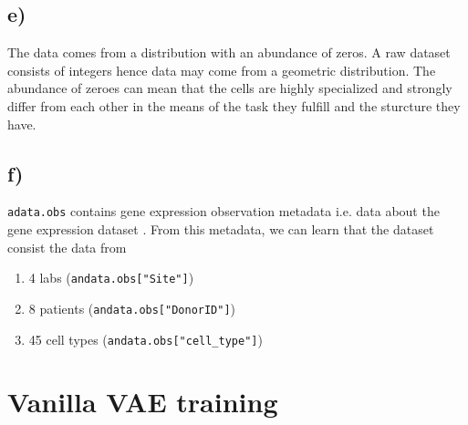 \documentclass[a4paper,11pt]{article}
\begin{document}
\subsection*{e)}
The data comes from a distribution with an abundance of zeros. A raw dataset consists of integers hence data may come from a geometric distribution. The abundance of zeroes can mean that the cells are highly specialized and strongly differ from each other in the means of the task they fulfill and the sturcture they have.
\subsection*{f)}
\texttt{adata.obs} contains gene expression observation metadata i.e. data about the gene expression dataset \cite{data}. From this metadata, we can learn that the dataset consist the data from
\begin{enumerate}
    \item 4 labs (\texttt{andata.obs["Site"]})
    \item 8 patients (\texttt{andata.obs["DonorID"]})
    \item 45 cell types (\texttt{andata.obs["cell\_type"]})
\end{enumerate}


\section{Vanilla VAE training}
\end{document}
